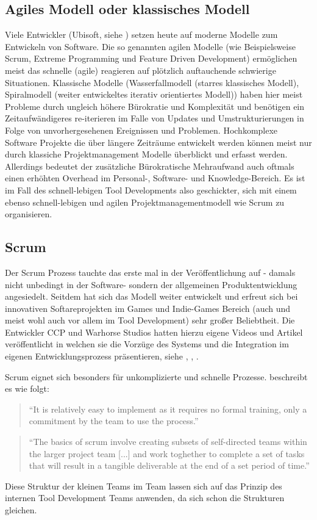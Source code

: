 \documentclass[pagesize, paper=a4, fontsize=12pt,titlepage=true, headings=small, headnosepline, abstractoff, liststotoc, nochapterprefix, plainheadsepline, twoside]{scrreprt}
\begin{document}
\subsection{Agiles Modell oder klassisches Modell}
Viele Entwickler (Ubisoft, siehe \cite{MKG:Schmitz2014}) setzen heute auf moderne Modelle zum Entwickeln von Software. Die so genannten agilen Modelle (wie Beispielsweise Scrum,  Extreme Programming und Feature Driven Development) ermöglichen meist das schnelle (agile) reagieren auf plötzlich auftauchende schwierige Situationen. Klassische Modelle (Wasserfallmodell (starres klassisches Modell), Spiralmodell (weiter entwickeltes iterativ orientiertes Modell)) haben hier meist Probleme durch ungleich höhere Bürokratie und Komplexität und benötigen ein Zeitaufwändigeres re-iterieren im Falle von Updates und Umstrukturierungen in Folge von unvorhergesehenen Ereignissen und Problemen. Hochkomplexe Software Projekte die über längere Zeiträume entwickelt werden können meist nur durch klassiche Projektmanagement Modelle überblickt und erfasst werden. Allerdings bedeutet der zusätzliche Bürokratische Mehraufwand auch oftmals einen erhöhten Overhead im Personal-, Software- und Knowledge-Bereich. Es ist im Fall des schnell-lebigen Tool Developments also geschickter, sich mit einem ebenso schnell-lebigen und agilen Projektmanagementmodell wie Scrum zu organisieren.

\subsection{Scrum}
Der Scrum Prozess tauchte das erste mal in der Veröffentlichung  auf - damals nicht unbedingt in der Software- sondern der allgemeinen Produktentwicklung angesiedelt. Seitdem hat sich das Modell weiter entwickelt und erfreut sich bei innovativen Softareprojekten im Games und Indie-Games Bereich (auch und meist wohl auch vor allem im Tool Development) sehr großer Beliebtheit. Die Entwickler CCP und Warhorse Studios hatten hierzu eigene Videos und Artikel veröffentlicht in welchen sie die Vorzüge des Systems und die Integration im eigenen Entwicklungsprozess präsentieren, siehe \cite{CCP:ScrumAndAgile2009}, \cite{WH:Scrum2013}, \cite{WH:ScrumVideo2013}.

Scrum eignet sich besonders für unkomplizierte und schnelle Prozesse. \autocite{Chandler2006} beschreibt es wie folgt:
\begin{quote}
“It is relatively easy to implement as it requires no formal training, only a commitment by the team to use the process.”
\cite[S. 45]{Chandler2006}
\end{quote}
\begin{quote}
“The basics of scrum involve creating subsets of self-directed teams within the larger project team [...] and work toghether to complete a set of tasks that will result in a tangible deliverable at the end of a set period of time.”
\cite[S. 45]{Chandler2006}
\end{quote}
Diese Struktur der kleinen Teams im Team lassen sich auf das Prinzip des internen Tool Development Teams anwenden, da sich schon die Strukturen gleichen.
\end{document}
